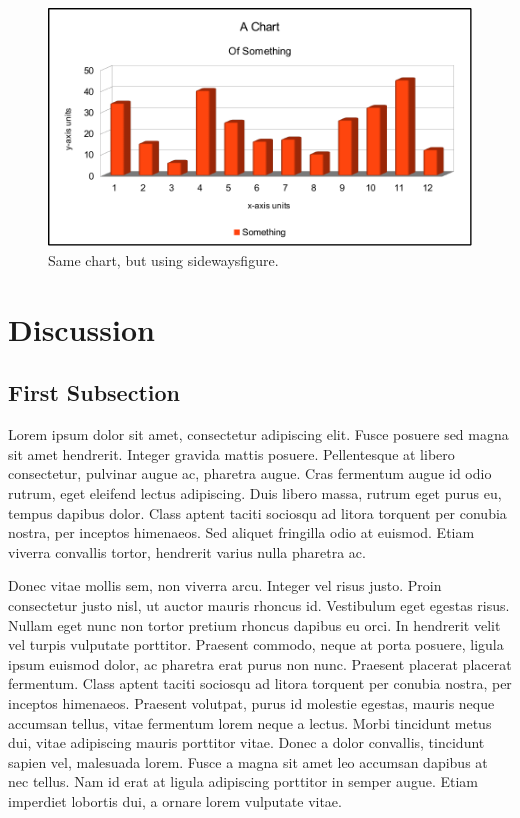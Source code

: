 \documentclass[double,12pt]{beavtex}
\begin{document}
\pagebreak[4]

\begin{figure}
\begin{center}
	\includegraphics[width=18cm]{chart.pdf}
	\caption{Same chart, but using sidewaysfigure.}
	\label{fig:rain}
	\end{center}
\end{figure}



\chapter{Discussion}

\section{First Subsection}

Lorem ipsum dolor sit amet, consectetur adipiscing elit. Fusce posuere sed magna sit amet hendrerit. Integer gravida mattis posuere. Pellentesque at libero consectetur, pulvinar augue ac, pharetra augue. Cras fermentum augue id odio rutrum, eget eleifend lectus adipiscing. Duis libero massa, rutrum eget purus eu, tempus dapibus dolor. Class aptent taciti sociosqu ad litora torquent per conubia nostra, per inceptos himenaeos. Sed aliquet fringilla odio at euismod. Etiam viverra convallis tortor, hendrerit varius nulla pharetra ac. 

Donec vitae mollis sem, non viverra arcu. Integer vel risus justo. Proin consectetur justo nisl, ut auctor mauris rhoncus id. Vestibulum eget egestas risus. Nullam eget nunc non tortor pretium rhoncus dapibus eu orci. In hendrerit velit vel turpis vulputate porttitor. Praesent commodo, neque at porta posuere, ligula ipsum euismod dolor, ac pharetra erat purus non nunc. Praesent placerat placerat fermentum. Class aptent taciti sociosqu ad litora torquent per conubia nostra, per inceptos himenaeos. Praesent volutpat, purus id molestie egestas, mauris neque accumsan tellus, vitae fermentum lorem neque a lectus. Morbi tincidunt metus dui, vitae adipiscing mauris porttitor vitae. Donec a dolor convallis, tincidunt sapien vel, malesuada lorem. Fusce a magna sit amet leo accumsan dapibus at nec tellus. Nam id erat at ligula adipiscing porttitor in semper augue. Etiam imperdiet lobortis dui, a ornare lorem vulputate vitae. 
\end{document}

